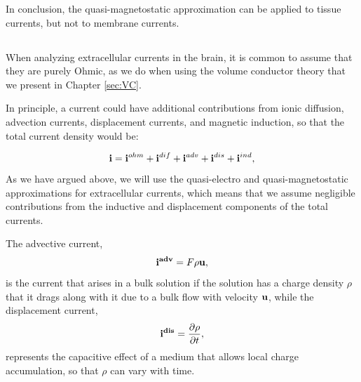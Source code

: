 In conclusion, the quasi-magnetostatic approximation can be applied to tissue currents, but not to membrane currents.


\subsection{}
\label{sec:VC:onlyohmic}
When analyzing extracellular currents in the brain, it is common to assume that they are purely Ohmic, as we do when using the volume conductor theory that we present in Chapter \ref{sec:VC}. 

In principle, a current could have additional contributions from ionic diffusion, advection currents, displacement currents, and magnetic induction, so that the total current density would be:

\begin{equation}
{\bf i} = {\bf i}^{ohm} + {\bf i}^{dif} + {\bf i}^{adv} + {\bf i}^{dis} + {\bf i}^{ind}, 
\label{VC:eq:generalcurrent}
\end{equation}
As we have argued above, we will use the quasi-electro and quasi-magnetostatic approximations for extracellular currents, which means that we assume negligible contributions from the inductive and displacement components of the total currents. 

The advective current, 
\begin{equation}
{\bf i^{adv}} = F \rho {\bf u}, 
\label{VC:eq:iadv}
\end{equation}
is the current that arises in a bulk solution if the solution has a charge density $\rho$ that it drags along with it due to a bulk flow with velocity ${\bf u}$, while the displacement current,
\begin{equation}
{\bf i^{dis}} = \frac{\partial \rho}{\partial t},
\label{VC:eq:idis}
\end{equation}
represents the capacitive effect of a medium that allows local charge accumulation, so that $\rho$ can vary with time.  

